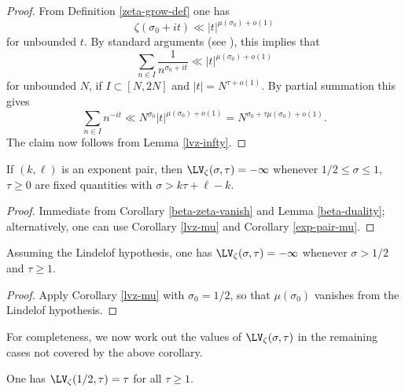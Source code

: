 \begin{proof} From Definition \ref{zeta-grow-def} one has
    $$ \zeta(\sigma_0 + it) \ll |t|^{\mu(\sigma_0) + o(1)}$$
    for unbounded $t$.  By standard arguments (see \cite[(8.13)]{ivic}), this implies that
    $$ \sum_{n \in I} \frac{1}{n^{\sigma_0+it}} \ll |t|^{\mu(\sigma_0) + o(1)}$$
    for unbounded $N$, if $I \subset [N,2N]$ and $|t| = N^{\tau+o(1)}$.  By partial summation this gives
    $$ \sum_{n \in I} n^{-it} \ll N^{\sigma_0} |t|^{\mu(\sigma_0) + o(1)} = N^{\sigma_0 + \tau \mu(\sigma_0) + o(1)}.$$
    The claim now follows from Lemma \ref{lvz-infty}.
\end{proof}

\begin{corollary}\label{lvz-exp} If $(k,\ell)$ is an exponent pair, then $\LV_\zeta(\sigma,\tau) = -\infty$ whenever $1/2 \leq \sigma \leq 1$, $\tau \geq 0$ are fixed quantities with $\sigma > k \tau + \ell - k$.
\end{corollary}

\begin{proof} Immediate from Corollary \ref{beta-zeta-vanish} and Lemma \ref{beta-duality}; alternatively, one can use Corollary \ref{lvz-mu} and Corollary \ref{exp-pair-mu}.
\end{proof}


\begin{corollary}\label{lh-vanish} Assuming the Lindelof hypothesis, one has $\LV_\zeta(\sigma,\tau) = -\infty$ whenever $\sigma > 1/2$ and $\tau \geq 1$.
\end{corollary}

\begin{proof} Apply Corollary \ref{lvz-mu} with $\sigma_0=1/2$, so that $\mu(\sigma_0)$ vanishes from the Lindelof hypothesis.
\end{proof}

For completeness, we now work out the values of $\LV_\zeta(\sigma,\tau)$ in the remaining cases not covered by the above corollary.

\begin{lemma}[Value at $\sigma=1/2$]\label{lvz-2} One has $\LV_\zeta(1/2,\tau) = \tau$ for all $\tau \geq 1$.
\end{lemma}

